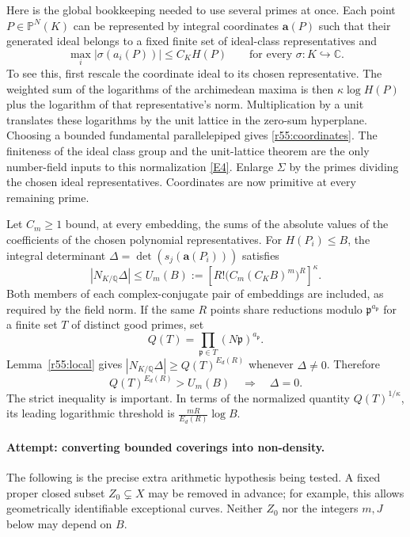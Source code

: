 \documentclass[11pt,a4paper]{article}
\newcommand{\Q}{\mathbb{Q}}
\newcommand{\C}{\mathbb{C}}
\newcommand{\eref}[2]{\hyperlink{extra:#1:#2}{[E#2]}}
\numberwithin{equation}{section}
\begin{document}
Here is the global bookkeeping needed to use several primes at once. Each point $P\in\mathbb P^N(K)$ can be represented by integral coordinates $\mathbf a(P)$ such that their generated ideal belongs to a fixed finite set of ideal-class representatives and
\begin{equation}\label{r55:coordinates}
 \max_i|\sigma(a_i(P))|\leq C_K H(P)
 \qquad\text{for every }\sigma:K\hookrightarrow\C.
\end{equation}
To see this, first rescale the coordinate ideal to its chosen representative. The weighted sum of the logarithms of the archimedean maxima is then $\kappa\log H(P)$ plus the logarithm of that representative's norm. Multiplication by a unit translates these logarithms by the unit lattice in the zero-sum hyperplane. Choosing a bounded fundamental parallelepiped gives \eqref{r55:coordinates}. The finiteness of the ideal class group and the unit-lattice theorem are the only number-field inputs to this normalization \eref{55}{4}. Enlarge $\Sigma$ by the primes dividing the chosen ideal representatives. Coordinates are now primitive at every remaining prime.

Let $C_m\geq1$ bound, at every embedding, the sums of the absolute values of the coefficients of the chosen polynomial representatives. For $H(P_i)\leq B$, the integral determinant
$\Delta=\det(s_j(\mathbf a(P_i)))$ satisfies
\begin{equation}\label{r55:normupper}
 |N_{K/\Q}\Delta|
 \leq U_m(B):=\left[R!\bigl(C_m(C_KB)^m\bigr)^R\right]^\kappa.
\end{equation}
Both members of each complex-conjugate pair of embeddings are included, as required by the field norm. If the same $R$ points share reductions modulo $\mathfrak p^{a_{\mathfrak p}}$ for a finite set $T$ of distinct good primes, set
\[
 Q(T)=\prod_{\mathfrak p\in T}(N\mathfrak p)^{a_{\mathfrak p}}.
\]
Lemma~\ref{r55:local} gives $|N_{K/\Q}\Delta|\geq Q(T)^{E_d(R)}$ whenever $\Delta\ne0$. Therefore
\begin{equation}\label{r55:threshold}
 Q(T)^{E_d(R)}>U_m(B)
 \quad\Longrightarrow\quad \Delta=0.
\end{equation}
The strict inequality is important. In terms of the normalized quantity $Q(T)^{1/\kappa}$, its leading logarithmic threshold is $\frac{mR}{E_d(R)}\log B$.

\paragraph{Attempt: converting bounded coverings into non-density.}
The following is the precise extra arithmetic hypothesis being tested. A fixed proper closed subset $Z_0\subsetneq X$ may be removed in advance; for example, this allows geometrically identifiable exceptional curves. Neither $Z_0$ nor the integers $m,J$ below may depend on $B$.
\end{document}

